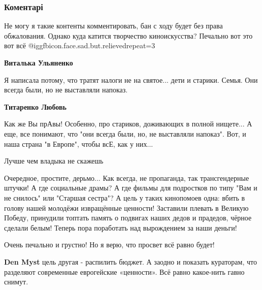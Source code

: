  
 
 
 
 
\subsubsection{Коментарі}

\begin{itemize} %
Не могу я такие контенты комментировать, бан с ходу будет без права обжалования.
Однако куда катится творчество киноискусства?
Печально вот это вот всё  @igg{fbicon.face.sad.but.relieved}{repeat=3} 

\begin{itemize} %
\textbf{Виталька Ульяненко} 

Я написала потому, что тратят налоги не на святое... дети и старики. Семья. Они
всегда были, но не выставляли напоказ.

\textbf{Титаренко Любовь} 

Как же Вы прАвы! Особенно, про стариков, доживающих в полной нищете... А еще,
все понимают, что "они всегда были, но, не выставляли напоказ". Вот, и наша
страна "в Европе", чтобы всЕ, как у них...

\end{itemize} %


Лучше чем владыка не скажешь


Очередное, простите, дерьмо... Как всегда, не пропаганда, так трансгендерные
штучки! А где социальные драмы? А где фильмы для подростков по типу "Вам и не
снилось" или "Старшая сестра"? А цель у таких кинопомоев одна: вбить в голову
нашей молодёжи извращённые ценности! Заставили плевать в Великую
Победу, принудили топтать память о подвигах наших дедов и прадедов, чёрное
сделали белым! Теперь пора поработать над вырождением за наши деньги!

Очень печально и грустно! Но я верю, что просвет всё равно будет!

\begin{itemize} %
\textbf{Den Myst} цель другая - распилить бюджет.
А заодно и показать кураторам, что разделяют современные еврогейские «ценности».
Всё равно какое-нить гавно снимут.
\end{itemize} %


\end{itemize}
